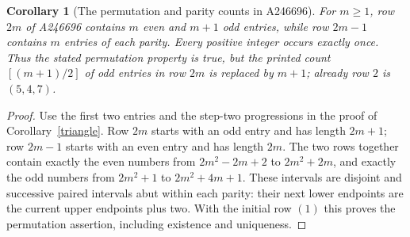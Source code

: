 \documentclass[11pt]{article}
\newtheorem{corollary}[theorem]{Corollary}
\begin{document}
\begin{corollary}[The permutation and parity counts in A246696]\label{permutation}
For $m\geq1$, row $2m$ of A246696 contains $m$ even and $m+1$ odd entries, while
row $2m-1$ contains $m$ entries of each parity. Every positive integer
occurs exactly once. Thus the stated permutation property is true, but
the printed count $[(m+1)/2]$ of odd entries in row $2m$ is replaced
by $m+1$; already row $2$ is $(5,4,7)$.
\end{corollary}
\begin{proof}
Use the first two entries and the step-two progressions in the proof of
Corollary~\ref{triangle}. Row $2m$ starts with an odd entry and has length
$2m+1$; row $2m-1$ starts with an even entry and has length $2m$.
The two rows together contain exactly the even numbers from
$2m^2-2m+2$ to $2m^2+2m$, and exactly the odd numbers from $2m^2+1$
to $2m^2+4m+1$. These intervals are disjoint and successive paired
intervals abut within each parity: their next lower endpoints are the
current upper endpoints plus two. With the initial row $(1)$ this proves
the permutation assertion, including existence and uniqueness.
\end{proof}
\end{document}
